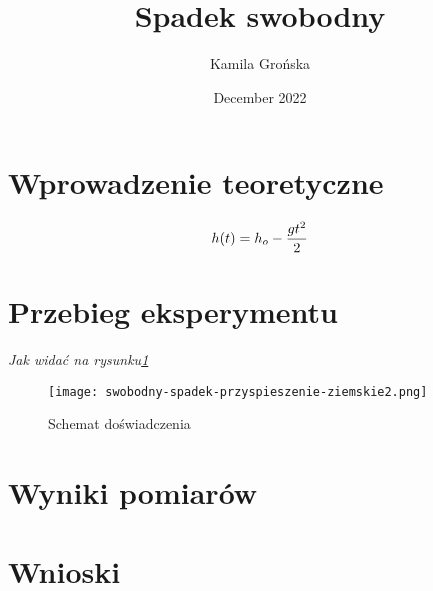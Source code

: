 \documentclass{article}
\title{Spadek swobodny}
\author{Kamila Grońska}
\date{December 2022}
\begin{document}
\maketitle
\section{Wprowadzenie teoretyczne}
\begin{center}
\begin{equation}
 h(t) = h_o-{gt^2\over 2}   
\end{equation}
\end{center}

\section{Przebieg eksperymentu }
\textit{Jak widać na rysunku\ref{fig:Schemat doświadczenia}}


\begin{figure}[h]
\begin{center}
    
\texttt{[image: swobodny-spadek-przyspieszenie-ziemskie2.png]}
\caption{Schemat doświadczenia}
\label{fig:Schemat doświadczenia}
\end{center}
\end{figure}

\newpage
\section{Wyniki pomiarów}




\section{Wnioski}
\end{document}
